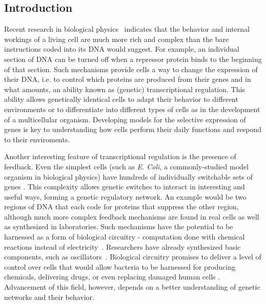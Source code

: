\documentclass[english,letterpaper,12pt]{report}
\begin{document}
\begin{doublespacing}

\chapter{Introduction} %
\label{sec:introduction}

Recent research in biological physics~\cite{ecoli-decision} indicates that the behavior and internal workings of a living cell are much more rich and complex than the bare instructions coded into its DNA would suggest. For example, an individual section of DNA can be turned off when a repressor protein binds to the beginning of that section. Such mechanisms provide cells a way to change the expression of their DNA, i.e. to control which proteins are produced from their genes and in what amounts, an ability known as (genetic) transcriptional regulation. This ability allows genetically identical cells to adapt their behavior to different environments or to differentiate into different types of cells as in the development of a multicellular organism. Developing models for the selective expression of genes is key to understanding how cells perform their daily functions and respond to their enviroments.

Another interesting feature of transcriptional regulation is the presence of feedback. Even the simplest cells (such as \textit{E. Coli}, a commonly-studied model organism in biological physics) have hundreds of individually switchable sets of  genes \cite{ecoli-operons}.  This complexity allows genetic switches to interact in interesting and useful ways, forming a genetic regulatory network. An example would be two regions of DNA that each code for proteins that suppress the other region, although much more complex feedback mechanisms are found in real cells as well as synthesized in laboratories.  Such mechanisms have the potential to be harnessed as a form of biological circuitry - computation done with chemical reactions instead of electricity~\cite{bio-circuits}. Researchers have already synthesized basic components, such as oscillators~\cite{synth-osc}. Biological circuitry promises to deliver a level of control over cells that would allow bacteria to be harnessed for producing chemicals, delivering drugs, or even replacing damaged human cells . Advancement of this field, however, depends on a better understanding of genetic networks and their behavior.


\end{doublespacing}
\end{document}
